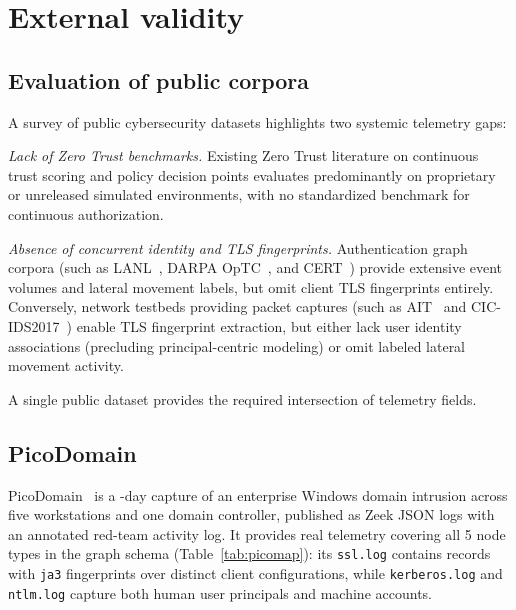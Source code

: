 \section{External validity}
\label{sec:external}

\subsection{Evaluation of public corpora}

A survey of public cybersecurity datasets highlights two systemic telemetry gaps:

\textit{Lack of Zero Trust benchmarks.} Existing Zero Trust literature on continuous
trust scoring and policy decision points evaluates predominantly on proprietary or
unreleased simulated environments, with no standardized benchmark for continuous authorization.

\textit{Absence of concurrent identity and TLS fingerprints.} Authentication graph
corpora (such as LANL~\cite{lanl}, DARPA OpTC~\cite{optc}, and CERT~\cite{cert}) provide
extensive event volumes and lateral movement labels, but omit client TLS fingerprints entirely.
Conversely, network testbeds providing packet captures (such as AIT~\cite{ait} and
CIC-IDS2017~\cite{cicids}) enable TLS fingerprint extraction, but either lack user identity
associations (precluding principal-centric modeling) or omit labeled lateral movement activity.

A single public dataset provides the required intersection of telemetry fields.

\subsection{PicoDomain}

PicoDomain~\cite{picodomain} is a \PicoSpan-day capture of an enterprise Windows domain
intrusion across five workstations and one domain controller, published as Zeek JSON logs
with an annotated red-team activity log. It provides real telemetry covering all 5 node
types in the graph schema (Table~\ref{tab:picomap}): its \texttt{ssl.log} contains \PicoSSLrecords{} records with
\texttt{ja3} fingerprints over \PicoJAthree{} distinct client configurations, while
\texttt{kerberos.log} and \texttt{ntlm.log} capture both human user principals and machine accounts.

